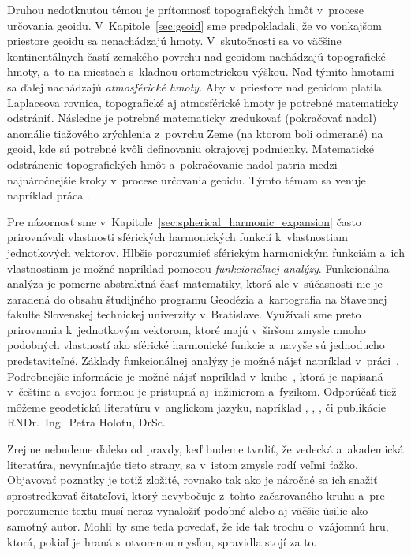 \documentclass[a4paper, 12pt]{book}
\begin{document}
Druhou nedotknutou témou je prítomnosť topografických hmôt v~procese určovania 
geoidu.  V~Kapitole~\ref{sec:geoid} sme predpokladali, že vo vonkajšom 
priestore geoidu sa nenachádzajú hmoty.  V~skutočnosti sa vo väčšine 
kontinentálnych častí zemského povrchu nad geoidom nachádzajú topografické 
hmoty, a~to na miestach s~kladnou ortometrickou výškou.  Nad týmito hmotami sa 
ďalej nachádzajú \emph{atmosférické hmoty}.  Aby v~priestore nad geoidom 
platila Laplaceova rovnica, topografické aj atmosférické hmoty je potrebné 
matematicky odstrániť.  Následne je potrebné matematicky zredukovať (pokračovať 
nadol) anomálie tiažového zrýchlenia z~povrchu Zeme (na ktorom boli odmerané) 
na geoid, kde sú potrebné kvôli definovaniu okrajovej podmienky.  Matematické 
odstránenie topografických hmôt a~pokračovanie nadol patria medzi 
najnáročnejšie kroky v~procese určovania geoidu.  Týmto témam sa venuje 
napríklad práca \textcite{Janak2006}.

Pre názornosť sme v~Kapitole~\ref{sec:spherical_harmonic_expansion} často 
prirovnávali vlastnosti sférických harmonických funkcií k~vlastnostiam 
jednotkových vektorov.  Hlbšie porozumieť sférickým harmonickým funkciám a~ich 
vlastnostiam je možné napríklad pomocou \emph{funkcionálnej analýzy}.  
Funkcionálna analýza je pomerne abstraktná časť matematiky, ktorá ale 
v~súčasnosti nie je zaradená do obsahu študijného programu Geodézia 
a~kartografia na Stavebnej fakulte Slovenskej technickej univerzity 
v~Bratislave.  Využívali sme preto prirovnania k~jednotkovým vektorom, ktoré 
majú v~širšom zmysle mnoho podobných vlastností ako sférické harmonické funkcie 
a~navyše sú jednoducho predstaviteľné.  Základy funkcionálnej analýzy je možné 
nájsť napríklad v~práci~\textcite{Janak2006}.  Podrobnejšie informácie je možné 
nájsť napríklad v~knihe~\textcite{Rektorys}, ktorá je napísaná v~češtine 
a~svojou formou je prístupná aj~inžinierom a~fyzikom.  Odporúčať tiež môžeme 
geodetickú literatúru v~anglickom jazyku, napríklad 
\textcite{MoritzAdvancedGeodesy}, \textcite{SansoGeoidDetermination}, 
\textcite{Borre2006}, \textcite{Freeden2009} či publikácie RNDr.~Ing.~Petra 
Holotu, DrSc.

Zrejme nebudeme ďaleko od pravdy, keď budeme tvrdiť, že vedecká a~akademická 
literatúra, nevynímajúc tieto strany, sa v~istom zmysle rodí veľmi ťažko.  
Objavovať poznatky je totiž zložité, rovnako tak ako je náročné sa ich snažiť 
sprostredkovať čitateľovi, ktorý nevybočuje z~tohto začarovaného kruhu a~pre 
porozumenie textu musí neraz vynaložiť podobné alebo aj väčšie úsilie ako 
samotný autor.  Mohli by sme teda povedať, že ide tak trochu o~vzájomnú hru, 
ktorá, pokiaľ je hraná s~otvorenou mysľou, spravidla stojí za to.
\end{document}
